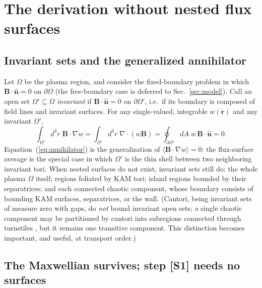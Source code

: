 \documentclass[english]{article}
\newcommand{\bB}{\mathbf{B}}
\newcommand{\br}{\mathbf{r}}
\newcommand{\bn}{\mathbf{n}}
\begin{document}
\section{The derivation without nested flux surfaces}
\label{sec:nosurfaces}

\subsection{Invariant sets and the generalized annihilator}
\label{sec:annihilator}

Let $\Omega$ be the plasma region, and consider the fixed-boundary problem in which
$\bB\cdot\hat{\bn}=0$ on $\partial\Omega$ (the free-boundary case is deferred to
Sec.~\ref{sec:model}). Call an open set $\Omega'\subseteq\Omega$ \emph{invariant} if
$\bB\cdot\hat{\bn}=0$ on $\partial\Omega'$, i.e.\ if its boundary is composed of field lines and
invariant surfaces. For any single-valued, integrable $w(\br)$ and any invariant $\Omega'$,
\begin{equation}
\int_{\Omega'} d^3r\;\bB\cdot\nabla w
=\int_{\Omega'} d^3r\;\nabla\cdot(w\bB)
=\oint_{\partial\Omega'} dA\;w\,\bB\cdot\hat{\bn}=0 .
\label{eq:annihilator}
\end{equation}
Equation~(\ref{eq:annihilator}) is the generalization of $\langle\bB\cdot\nabla w\rangle=0$: the
flux-surface average is the special case in which $\Omega'$ is the thin shell between two
neighboring invariant tori. When nested surfaces do not exist, invariant sets still do: the whole
plasma $\Omega$ itself; regions foliated by KAM tori; island regions bounded by their separatrices;
and each connected chaotic component, whose boundary consists of bounding KAM surfaces, separatrices,
or the wall. (Cantori, being invariant sets of measure zero with gaps, do \emph{not} bound invariant
open sets; a single chaotic component may be partitioned by cantori into subregions connected
through turnstiles \cite{meiss1992}, but it remains one transitive component. This distinction
becomes important, and useful, at transport order.)

\subsection{The Maxwellian survives; step [S1] needs no surfaces}
\label{sec:maxwellian}
\end{document}
